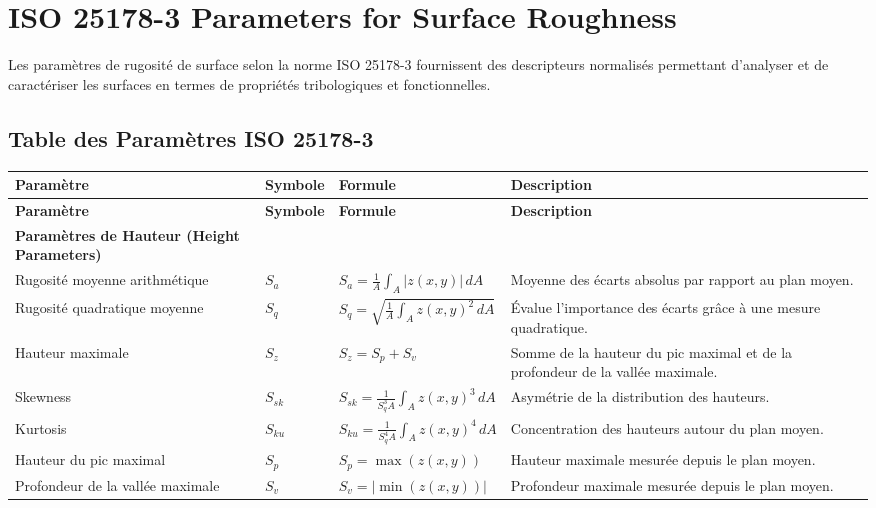 \section{ISO 25178-3 Parameters for Surface Roughness}

Les paramètres de rugosité de surface selon la norme ISO 25178-3 fournissent des descripteurs normalisés permettant d’analyser et de caractériser les surfaces en termes de propriétés tribologiques et fonctionnelles.

\subsection{Table des Paramètres ISO 25178-3}

\begin{longtable}{|p{3.5cm}|p{1.5cm}|p{6cm}|p{6cm}|}
    \hline
    \textbf{Paramètre} & \textbf{Symbole} & \textbf{Formule} & \textbf{Description} \\ \hline
    \endfirsthead
    \hline
    \textbf{Paramètre} & \textbf{Symbole} & \textbf{Formule} & \textbf{Description} \\ \hline
    \endhead
    \hline
    \endfoot
    \textbf{Paramètres de Hauteur (Height Parameters)} & & & \\ \hline
    Rugosité moyenne arithmétique & $S_a$ & $S_a = \frac{1}{A} \int_A |z(x, y)| \, dA$ & Moyenne des écarts absolus par rapport au plan moyen. \\ \hline
    Rugosité quadratique moyenne & $S_q$ & $S_q = \sqrt{\frac{1}{A} \int_A z(x, y)^2 \, dA}$ & Évalue l’importance des écarts grâce à une mesure quadratique. \\ \hline
    Hauteur maximale & $S_z$ & $S_z = S_p + S_v$ & Somme de la hauteur du pic maximal et de la profondeur de la vallée maximale. \\ \hline
    Skewness & $S_{sk}$ & $S_{sk} = \frac{1}{S_q^3 A} \int_A z(x, y)^3 \, dA$ & Asymétrie de la distribution des hauteurs. \\ \hline
    Kurtosis & $S_{ku}$ & $S_{ku} = \frac{1}{S_q^4 A} \int_A z(x, y)^4 \, dA$ & Concentration des hauteurs autour du plan moyen. \\ \hline
    Hauteur du pic maximal & $S_p$ & $S_p = \max(z(x, y))$ & Hauteur maximale mesurée depuis le plan moyen. \\ \hline
    Profondeur de la vallée maximale & $S_v$ & $S_v = |\min(z(x, y))|$ & Profondeur maximale mesurée depuis le plan moyen. \\ \hline


\end{longtable}
